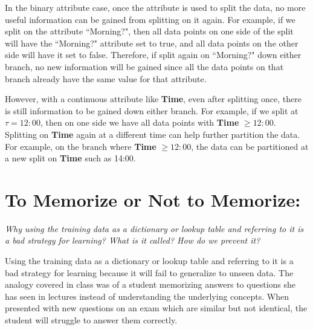 \documentclass[fleqn]{article}
\begin{document}
\begin{enumerate}
	      In the binary attribute case, once the attribute is used to split the data, no more useful information can be gained from splitting on it again.
	      For example, if we split on the attribute ``Morning?", then all data points on one side of the split will have the ``Morning?" attribute set to true,
	      and all data points on the other side will have it set to false.
	      Therefore, if split again on ``Morning?" down either branch, no new information will be gained since all the data points on that branch already have the same value for that attribute.

	      However, with a continuous attribute like \textbf{Time}, even after splitting once, there is still information to be gained down either branch.
	      For example, if we split at $\tau = 12:00$, then on one side we have all data points with \textbf{Time} $\geq 12:00$.
	      Splitting on \textbf{Time} again at a different time can help further partition the data.
	      For example, on the branch where \textbf{Time} $\geq 12:00$, the data can be partitioned at a new split on \textbf{Time} such as 14:00.

\end{enumerate}




\section{To Memorize or Not to Memorize:}
\textit{Why using the training data as a dictionary or lookup table and referring to it is a bad strategy for learning? What is it called? How do we prevent it?}

Using the training data as a dictionary or lookup table and referring to it is a bad strategy for learning because it will fail to generalize to unseen data.
The analogy covered in class was of a student memorizing answers to questions she has seen in lectures instead of understanding the underlying concepts.
When presented with new questions on an exam which are similar but not identical, the student will struggle to answer them correctly.
\end{document}
